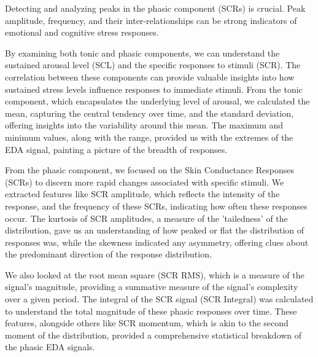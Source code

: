 Detecting and analyzing peaks in the phasic component (SCRs) is crucial. Peak amplitude, frequency, and their inter-relationships can be strong indicators of emotional and cognitive stress responses.

By examining both tonic and phasic components, we can understand the sustained arousal level (SCL) and the specific responses to stimuli (SCR). The correlation between these components can provide valuable insights into how sustained stress levels influence responses to immediate stimuli.
From the tonic component, which encapsulates the underlying level of arousal, we calculated the mean, capturing the central tendency over time, and the standard deviation, offering insights into the variability around this mean. The maximum and minimum values, along with the range, provided us with the extremes of the EDA signal, painting a picture of the breadth of responses.

From the phasic component, we focused on the Skin Conductance Responses (SCRs) to discern more rapid changes associated with specific stimuli. We extracted features like SCR amplitude, which reflects the intensity of the response, and the frequency of these SCRs, indicating how often these responses occur. The kurtosis of SCR amplitudes, a measure of the 'tailedness' of the distribution, gave us an understanding of how peaked or flat the distribution of responses was, while the skewness indicated any asymmetry, offering clues about the predominant direction of the response distribution.

We also looked at the root mean square (SCR RMS), which is a measure of the signal's magnitude, providing a summative measure of the signal's complexity over a given period. The integral of the SCR signal (SCR Integral) was calculated to understand the total magnitude of these phasic responses over time. These features, alongside others like SCR momentum, which is akin to the second moment of the distribution, provided a comprehensive statistical breakdown of the phasic EDA signals.

